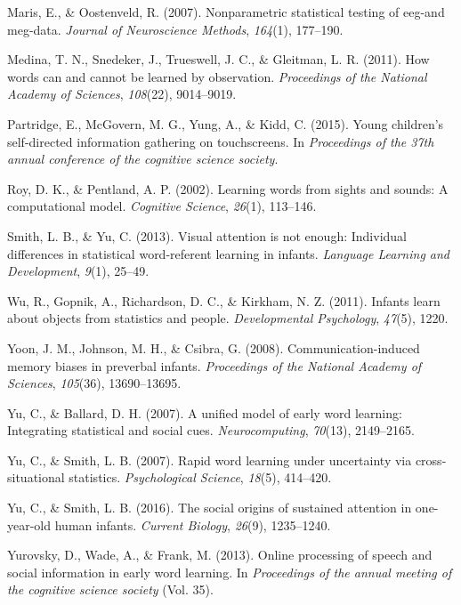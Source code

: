 \documentclass[10pt, letterpaper]{article}
\begin{document}
\leavevmode\hypertarget{ref-maris2007nonparametric}{}%
Maris, E., \& Oostenveld, R. (2007). Nonparametric statistical testing
of eeg-and meg-data. \emph{Journal of Neuroscience Methods},
\emph{164}(1), 177--190.

\leavevmode\hypertarget{ref-medina2011words}{}%
Medina, T. N., Snedeker, J., Trueswell, J. C., \& Gleitman, L. R.
(2011). How words can and cannot be learned by observation.
\emph{Proceedings of the National Academy of Sciences}, \emph{108}(22),
9014--9019.

\leavevmode\hypertarget{ref-partridge2015young}{}%
Partridge, E., McGovern, M. G., Yung, A., \& Kidd, C. (2015). Young
children's self-directed information gathering on touchscreens. In
\emph{Proceedings of the 37th annual conference of the cognitive science
society}.

\leavevmode\hypertarget{ref-roy2002learning}{}%
Roy, D. K., \& Pentland, A. P. (2002). Learning words from sights and
sounds: A computational model. \emph{Cognitive Science}, \emph{26}(1),
113--146.

\leavevmode\hypertarget{ref-smith2013visual}{}%
Smith, L. B., \& Yu, C. (2013). Visual attention is not enough:
Individual differences in statistical word-referent learning in infants.
\emph{Language Learning and Development}, \emph{9}(1), 25--49.

\leavevmode\hypertarget{ref-wu2011infants}{}%
Wu, R., Gopnik, A., Richardson, D. C., \& Kirkham, N. Z. (2011). Infants
learn about objects from statistics and people. \emph{Developmental
Psychology}, \emph{47}(5), 1220.

\leavevmode\hypertarget{ref-yoon2008communication}{}%
Yoon, J. M., Johnson, M. H., \& Csibra, G. (2008). Communication-induced
memory biases in preverbal infants. \emph{Proceedings of the National
Academy of Sciences}, \emph{105}(36), 13690--13695.

\leavevmode\hypertarget{ref-yu2007unified}{}%
Yu, C., \& Ballard, D. H. (2007). A unified model of early word
learning: Integrating statistical and social cues.
\emph{Neurocomputing}, \emph{70}(13), 2149--2165.

\leavevmode\hypertarget{ref-yu2007rapid}{}%
Yu, C., \& Smith, L. B. (2007). Rapid word learning under uncertainty
via cross-situational statistics. \emph{Psychological Science},
\emph{18}(5), 414--420.

\leavevmode\hypertarget{ref-yu2016social}{}%
Yu, C., \& Smith, L. B. (2016). The social origins of sustained
attention in one-year-old human infants. \emph{Current Biology},
\emph{26}(9), 1235--1240.

\leavevmode\hypertarget{ref-yurovsky2013online}{}%
Yurovsky, D., Wade, A., \& Frank, M. (2013). Online processing of speech
and social information in early word learning. In \emph{Proceedings of
the annual meeting of the cognitive science society} (Vol. 35).


\end{document}
